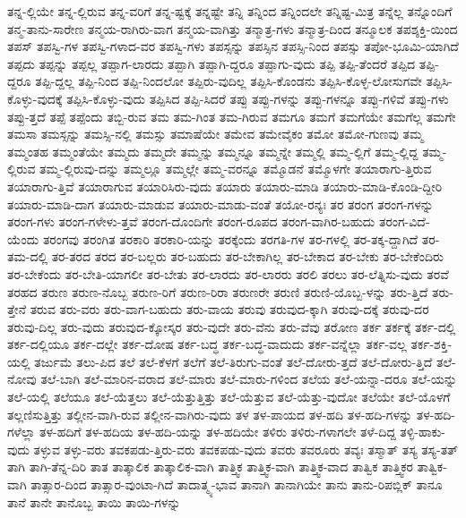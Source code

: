 {ತನ್ನ-ಲ್ಲಿಯೇ
ತನ್ನ-ಲ್ಲಿರುವ
ತನ್ನ-ವರಿಗೆ
ತನ್ನ-ಷ್ಟಕ್ಕೆ
ತನ್ನಷ್ಟೇ
ತನ್ನಿ
ತನ್ನಿಂದ
ತನ್ನಿಂದಲೇ
ತನ್ನಿಷ್ಟ-ಮಿತ್ರ
ತನ್ನೆಲ್ಲ
ತನ್ನೊಂದಿಗೆ
ತನ್ಮ-ತಾನು-ಸಾರೇಣ
ತನ್ಮಯ-ರಾಗಿರು-ವಾಗ
ತನ್ಮಯ-ವಾಗಿತ್ತು
ತನ್ಮಾತ್ರ-ಗಳು
ತನ್ಮಾತ್ರ-ದಿಂದ
ತನ್ಮೂಲಕ
ತಪಶ್ಶಕ್ತಿ-ಯಿಂದ
ತಪಸ್
ತಪಸ್ವಿ-ಗಳ
ತಪಸ್ವಿ-ಗಳಾದ-ವರ
ತಪಸ್ವಿ-ಗಳು
ತಪಸ್ಸನ್ನು
ತಪಸ್ಸಿನ
ತಪಸ್ಸಿ-ನಿಂದ
ತಪಸ್ಸು
ತಪೋ-ಭೂಮಿ-ಯಾಗಿದೆ
ತಪ್ಪದು
ತಪ್ಪನ್ನು
ತಪ್ಪಲ್ಲ
ತಪ್ಪಾಗ-ಲಾರದು
ತಪ್ಪಾಗಿ
ತಪ್ಪಾಗಿ-ದ್ದರೂ
ತಪ್ಪಾಗು-ವುದು
ತಪ್ಪಿ
ತಪ್ಪಿ-ತೆಂದರೆ
ತಪ್ಪಿದ
ತಪ್ಪಿ-ದ್ದರೂ
ತಪ್ಪಿ-ದ್ದಲ್ಲ
ತಪ್ಪಿ-ನಿಂದ
ತಪ್ಪಿ-ನಿಂದಲೋ
ತಪ್ಪಿರು-ವುದಿಲ್ಲ
ತಪ್ಪಿಸಿ-ಕೊಂಡನು
ತಪ್ಪಿಸಿ-ಕೊಳ್ಳ-ಲೋಸುಗವೇ
ತಪ್ಪಿಸಿ-ಕೊಳ್ಳು-ವುದಕ್ಕೆ
ತಪ್ಪಿಸಿ-ಕೊಳ್ಳು-ವುದು
ತಪ್ಪಿಸಿದ
ತಪ್ಪಿ-ಸಿದರೆ
ತಪ್ಪು
ತಪ್ಪು-ಗಳನ್ನು
ತಪ್ಪು-ಗಳನ್ನೂ
ತಪ್ಪು-ಗಳಿವೆ
ತಪ್ಪು-ಗಳು
ತಪ್ಪು-ತ್ತದೆ
ತಪ್ಪೆ
ತಪ್ಪೆಂದು
ತಬ್ಬಿ-ರುವ
ತಮ
ತಮ-ಗಿಂತ
ತಮ-ಗಿರುವ
ತಮಗೂ
ತಮಗೆ
ತಮಗೆಯೇ
ತಮಗೆಲ್ಲ
ತಮಗೇ
ತಮಸಾ
ತಮಸ್ಸನ್ನು
ತಮಸ್ಸಿ-ನಲ್ಲಿ
ತಮಸ್ಸು
ತಮಾಷೆಯೇ
ತಮೇವ
ತಮೇವೈಕಂ
ತಮೋ
ತಮೋ-ಗುಣವು
ತಮ್ಮ
ತಮ್ಮಂತಹ
ತಮ್ಮಂತೆಯೇ
ತಮ್ಮದು
ತಮ್ಮದೇ
ತಮ್ಮನ್ನು
ತಮ್ಮನ್ನೂ
ತಮ್ಮನ್ನೇ
ತಮ್ಮಲ್ಲಿ
ತಮ್ಮ-ಲ್ಲಿಗೆ
ತಮ್ಮ-ಲ್ಲಿದ್ದ
ತಮ್ಮ-ಲ್ಲಿರುವ
ತಮ್ಮ-ಲ್ಲಿರುವು-ದನ್ನು
ತಮ್ಮಲ್ಲೂ
ತಮ್ಮಲ್ಲೇ
ತಮ್ಮ-ವರನ್ನೂ
ತಮ್ಮೊಡನೆ
ತಮ್ಮೊಳಗೇ
ತಯಾರಾಗು-ತ್ತಿರುವ
ತಯಾರಾಗು-ತ್ತಿವೆ
ತಯಾರಾಗುವ
ತಯಾರಿಸಿರು-ವುದು
ತಯಾರು
ತಯಾರು-ಮಾಡಿ
ತಯಾರು-ಮಾಡಿ-ಕೊಂಡಿ-ದ್ದೀರಿ
ತಯಾರು-ಮಾಡಿ-ದಾಗ
ತಯಾರು-ಮಾಡುವ
ತಯಾರು-ಮಾಡು-ವಂತೆ
ತಯೋ-ರನ್ಯಃ
ತರ
ತರಂಗ
ತರಂಗ-ಗಳನ್ನು
ತರಂಗ-ಗಳು
ತರಂಗ-ಗಳೇಳು-ತ್ತವೆ
ತರಂಗ-ದೊಂದಿಗೇ
ತರಂಗ-ರೂಪದ
ತರಂಗ-ವಾಗಿರ-ಬಹುದು
ತರಂಗ-ವಿದೆ-ಯೆಂದು
ತರಂಗವು
ತರಂಗಿತ
ತರಕಾರಿ
ತರಕಾರಿ-ಯನ್ನು
ತರಕ್ಕೆಂದು
ತರಗತಿ-ಗಳ
ತರ-ಗಳಲ್ಲಿ
ತರ-ತಕ್ಕ-ದ್ದಾಗಿದೆ
ತರ-ತಮ-ದಲ್ಲಿ
ತರ-ತರದ
ತರದ
ತರ-ಬಲ್ಲರು
ತರ-ಬಹುದು
ತರ-ಬೇಕಾಗಿಲ್ಲ
ತರ-ಬೇಕಾದ
ತರ-ಬೇಕು
ತರ-ಬೇಕೆಂದಿರು
ತರ-ಬೇಕೆಂದು
ತರ-ಬೇತಿ-ಯಾಗಲೀ
ತರ-ಬೇತು
ತರ-ಲಾರದು
ತರ-ಲಾರರು
ತರಲಿ
ತರಲು
ತರ-ಲೆತ್ನಿಸು-ವುದು
ತರವೆ
ತರಹದ
ತರುಣ
ತರುಣ-ನೊಬ್ಬ
ತರುಣ-ರಿಗೆ
ತರುಣ-ರಿರಾ
ತರುಣರೇ
ತರುಣಿ
ತರುಣಿ-ಯೊಬ್ಬ-ಳನ್ನು
ತರು-ತ್ತಿದೆ
ತರು-ತ್ತೇನೆ
ತರುವ
ತರು-ವರು
ತರು-ವಾಗ-ಬಹುದು
ತರು-ವಾಯ
ತರುವು
ತರುವುದ-ಕ್ಕಾಗಿ
ತರುವು-ದಕ್ಕೆ
ತರುವು-ದರ
ತರುವು-ದಿಲ್ಲ
ತರು-ವುದು
ತರುವುದ-ಕ್ಕೋಸ್ಕರ
ತರು-ವುದೇ
ತರು-ವೆನು
ತರು-ವೆವು
ತರೋಣ
ತರ್ಕ
ತರ್ಕಕ್ಕೆ
ತರ್ಕ-ದಲ್ಲಿ
ತರ್ಕ-ದಲ್ಲಿಯೂ
ತರ್ಕ-ದಲ್ಲೇ
ತರ್ಕ-ದೋಷ
ತರ್ಕ-ಬದ್ಧ
ತರ್ಕ-ಬದ್ಧ-ವಾದುದು
ತರ್ಕ-ವನ್ನೆಲ್ಲಾ
ತರ್ಕ-ವಲ್ಲ
ತರ್ಕ-ಶಕ್ತಿ-ಯಲ್ಲಿ
ತರ್ಜುಮೆ
ತಲು-ಪಿದ
ತಲೆ
ತಲೆ-ಕೆಳಗೆ
ತಲೆಗೆ
ತಲೆ-ತಿರುಗು-ವಂತೆ
ತಲೆ-ದೋರು-ತ್ತದೆ
ತಲೆ-ದೋರು-ತ್ತಿದೆ
ತಲೆ-ನೋವು
ತಲೆ-ಬಾಗಿ
ತಲೆ-ಮಾರಿನ-ವರಾದ
ತಲೆ-ಮಾರು
ತಲೆ-ಮಾರು-ಗಳಿಂದ
ತಲೆಯ
ತಲೆ-ಯನ್ನಾ-ದರೂ
ತಲೆ-ಯನ್ನು
ತಲೆ-ಯಲ್ಲಿ
ತಲೆಯೂ
ತಲೆ-ಯೆತ್ತಲು
ತಲೆ-ಯೆತ್ತುತ್ತಿತ್ತು
ತಲೆ-ಯೆತ್ತುವ
ತಲೆ-ಯೆತ್ತು-ವುದೋ
ತಲೆಯೇ
ತಲೆ-ಯೊಳಗೆ
ತಲ್ಲಣಿಸುತ್ತಿತ್ತು
ತಲ್ಲೀನ-ವಾಗಿ-ರುವ
ತಲ್ಲೀನ-ವಾಗಿರು-ವುದು
ತಳ
ತಳ-ಪಾಯದ
ತಳ-ಹದಿ
ತಳ-ಹದಿ-ಗಳನ್ನು
ತಳ-ಹದಿ-ಗಳೆಲ್ಲಾ
ತಳ-ಹದಿಗೆ
ತಳ-ಹದಿಯ
ತಳ-ಹದಿ-ಯನ್ನು
ತಳ-ಹದಿಯೇ
ತಳಿರು
ತಳಿರು-ಗಳಾಗಲೇ
ತಳೆ-ದಿದ್ದ
ತಳ್ಳಿ-ಹಾಕು-ವುದು
ತಳ್ಳುವ
ತಳ್ಳು-ವರು
ತವಕಪಡು-ತ್ತಿರು-ವರು
ತವಕಪಡು-ವುದು
ತವರು
ತವರೂರು
ತವ್ಯಃ
ತಸ್ಮಾತ್
ತಸ್ಯ
ತಸ್ಯ-ತತ್
ತಾಗಿ
ತಾಗಿ-ತೆನ್ನ-ದಿರಿ
ತಾತ
ತಾತ್ಕಾಲಿಕ
ತಾತ್ಕಾಲಿಕ-ವಾಗಿ
ತಾತ್ತ್ವಿಕ
ತಾತ್ತ್ವಿಕ-ವಾಗಿ
ತಾತ್ತ್ವಿಕ-ವಾದ
ತಾತ್ವಿಕ
ತಾತ್ತ್ವಿಕರ
ತಾತ್ವಿಕ-ವಾಗಿ
ತಾತ್ಸಾರ-ದಿಂದ
ತಾತ್ಸಾರ-ವುಂಟಾ-ಗಿದೆ
ತಾದಾತ್ಮ್ಯ-ಭಾವ
ತಾನಾಗಿ
ತಾನಾಗಿಯೇ
ತಾನು
ತಾನು-ರಿಪಬ್ಲಿಕ್
ತಾನೂ
ತಾನೆ
ತಾನೇ
ತಾನೊಬ್ಬ
ತಾಯಿ
ತಾಯಿ-ಗಳನ್ನು
}
